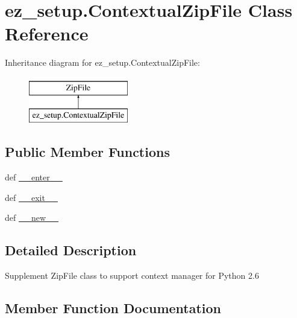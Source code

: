 \hypertarget{classez__setup_1_1ContextualZipFile}{}\section{ez\+\_\+setup.\+Contextual\+Zip\+File Class Reference}
\label{classez__setup_1_1ContextualZipFile}
Inheritance diagram for ez\+\_\+setup.\+Contextual\+Zip\+File\+:\begin{figure}[H]
\begin{center}
\leavevmode
\includegraphics[height=2.000000cm]{classez__setup_1_1ContextualZipFile}
\end{center}
\end{figure}
\subsection*{Public Member Functions}
\begin{DoxyCompactItemize}
\item 
def \hyperlink{classez__setup_1_1ContextualZipFile_ae49baab63174824010f328f371b28a0a}{\+\_\+\+\_\+enter\+\_\+\+\_\+}
\item 
def \hyperlink{classez__setup_1_1ContextualZipFile_a649fb84b9f15e98ec922caec7475c6da}{\+\_\+\+\_\+exit\+\_\+\+\_\+}
\item 
def \hyperlink{classez__setup_1_1ContextualZipFile_a23fb0ac405bd1d3589232a1f07afeece}{\+\_\+\+\_\+new\+\_\+\+\_\+}
\end{DoxyCompactItemize}


\subsection{Detailed Description}
\begin{DoxyVerb}Supplement ZipFile class to support context manager for Python 2.6
\end{DoxyVerb}
 

\subsection{Member Function Documentation}
\hypertarget{classez__setup_1_1ContextualZipFile_ae49baab63174824010f328f371b28a0a}{}
